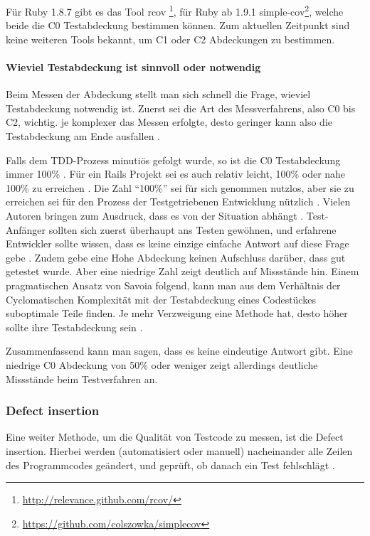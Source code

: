  Für Ruby 1.8.7 gibt es das Tool rcov \footnote{\url{http://relevance.github.com/rcov/}}, für Ruby ab 1.9.1 simple-cov\footnote{\url{https://github.com/colszowka/simplecov}}, welche beide die C0 Testabdeckung bestimmen können. Zum aktuellen Zeitpunkt sind keine weiteren Tools bekannt, um C1 oder C2 Abdeckungen zu bestimmen.
 \paragraph{Wieviel Testabdeckung ist sinnvoll oder notwendig}
 
 Beim Messen der Abdeckung stellt man sich schnell die Frage, wieviel Testabdeckung notwendig ist. Zuerst sei die Art des Messverfahrens, also C0 bis C2, wichtig. je komplexer das Messen erfolgte, desto geringer kann also die Testabdeckung am Ende ausfallen \citep{catherine_powell_abakas_2008}.
 
 Falls dem TDD-Prozess minutiös gefolgt wurde, so ist die C0 Testabdeckung immer 100\% \citep{beck_test_2002}. Für ein Rails Projekt sei es auch relativ leicht, 100\% oder nahe 100\% zu erreichen \citep{rappin_rails_2011}. Die Zahl "`100\%"' sei für sich genommen nutzlos, aber sie zu erreichen sei für den Prozess der Testgetriebenen Entwicklung nützlich \citep[S. 270]{rappin_rails_2011}. Vielen Autoren bringen zum Ausdruck, dass es von der Situation abhängt \citep{infoq_2007}. Test-Anfänger sollten sich zuerst überhaupt ans Testen gewöhnen, und erfahrene Entwickler sollte wissen, dass es keine einzige einfache Antwort auf diese Frage gebe \citep{infoq_2007}. Zudem gebe eine Hohe Abdeckung keinen Aufschluss darüber, dass gut getestet wurde. Aber eine niedrige Zahl zeigt deutlich auf Missstände hin.
 Einem pragmatischen Ansatz von Savoia folgend, kann man aus dem Verhältnis der Cyclomatischen Komplexität mit der Testabdeckung eines Codestückes suboptimale Teile finden. Je mehr Verzweigung eine Methode hat, desto höher sollte ihre Testabdeckung sein \citep{alberto_savoia_code_2007}.
 
 Zusammenfassend kann man sagen, dass es keine eindeutige Antwort gibt. Eine niedrige C0 Abdeckung von 50\% oder weniger zeigt allerdings deutliche Missstände beim Testverfahren an.
 
 \subsubsection{Defect insertion}
 Eine weiter Methode, um die Qualität von Testcode zu messen, ist die Defect insertion. Hierbei werden (automatisiert oder manuell) nacheinander alle Zeilen des Programmcodes geändert, und geprüft, ob danach ein Test fehlschlägt \citep{beck_test_2002}.
 

